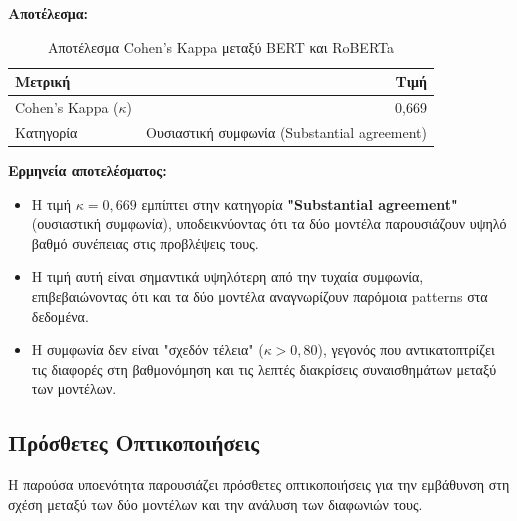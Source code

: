 \documentclass[a4paper,11pt,oneside,openany]{ioniothesis}
\begin{document}
\textbf{Αποτέλεσμα:}

\begin{table}[H]
\centering
\caption{Αποτέλεσμα Cohen's Kappa μεταξύ BERT και RoBERTa}
\label{tab:kappa_result}
\begin{tabular}{@{}lr@{}}
\toprule
\textbf{Μετρική} & \textbf{Τιμή} \\
\midrule
Cohen's Kappa ($\kappa$) & 0,669 \\
Κατηγορία & Ουσιαστική συμφωνία (Substantial agreement) \\
\bottomrule
\end{tabular}
\end{table}

\textbf{Ερμηνεία αποτελέσματος:}
\begin{itemize}
    \item Η τιμή $\kappa = 0,669$ εμπίπτει στην κατηγορία \textbf{"Substantial agreement"} (ουσιαστική συμφωνία), υποδεικνύοντας ότι τα δύο μοντέλα παρουσιάζουν υψηλό βαθμό συνέπειας στις προβλέψεις τους.
    
    \item Η τιμή αυτή είναι σημαντικά υψηλότερη από την τυχαία συμφωνία, επιβεβαιώνοντας ότι και τα δύο μοντέλα αναγνωρίζουν παρόμοια patterns στα δεδομένα.
    
    \item Η συμφωνία δεν είναι "σχεδόν τέλεια" ($\kappa > 0,80$), γεγονός που αντικατοπτρίζει τις διαφορές στη βαθμονόμηση και τις λεπτές διακρίσεις συναισθημάτων μεταξύ των μοντέλων.
\end{itemize}
























\subsection{Πρόσθετες Οπτικοποιήσεις}
\label{sec:Πρόσθετες Οπτικοποιήσεις}

Η παρούσα υποενότητα παρουσιάζει πρόσθετες οπτικοποιήσεις για την εμβάθυνση στη σχέση μεταξύ των δύο μοντέλων και την ανάλυση των διαφωνιών τους.
\end{document}
